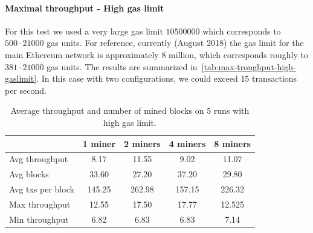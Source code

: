 \paragraph{Maximal throughput - High gas limit}
\label{sec:max-throughput-high-gaslimit}
For this test we used a very large gas limit $10500000$ which corresponds to $500
\cdot 21000$ gas units. For reference, currently
(August 2018) the gas limit for the main Ethereum network is approximately $8$
million, which corresponds roughly to $381 \cdot 21000$ gas units. The results are
summarized in~\autoref{tab:max-troughput-high-gaslimit}. In this case with two
configurations, we could exceed $15$ transactions per second.

\begin{table}[h!]
  \centering
  \begin{tabular}{l | cccc}
    & 1 miner & 2 miners & 4 miners & 8 miners \\ \hline
    Avg throughput & 8.17 & 11.55 & 9.02 & 11.07 \\
    Avg blocks & 33.60 & 27.20 & 37.20 & 29.80 \\
    Avg txs per block & 145.25 & 262.98 & 157.15 & 226.32  \\
    Max throughput & 12.55 & 17.50 & 17.77 & 12.525 \\
    Min throughput & 6.82 & 6.83 & 6.83 & 7.14 \\
  \end{tabular}
  \caption{Average throughput and number of mined blocks on 5 runs with high gas limit.}
  \label{tab:max-troughput-high-gaslimit}
\end{table}
